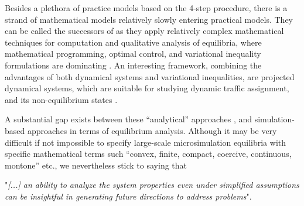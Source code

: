 Besides a plethora of practice models based on the 4-step procedure, there is a strand of mathematical models relatively slowly entering practical models. They can be called the successors of \citet[][]{BeckmannEtAl_1956} as they apply relatively complex mathematical techniques for computation and qualitative analysis of equilibria, where mathematical programming, optimal control, and variational inequality formulations are dominating \citep[][]{KinderlehrerStampacchia_1980, Dafermos_TransScience_1980, Smith_TransResB_1979, Dafermos_MP_1983, Smith_TransResB_1993, FrieszEtAl_OR_1993, Smith_TransResB_1993, Nagurney_1993, Friesz_TransScience_1996, Nagurney_FloudasPardalos_2001, BierlaireCrittin_TransScience_2006, LinDYEtAl_TRR_2008, Friesz_Hillier_2010, HarkerPang_MP_1990, NoorEtAl_JCAM_1993}. An interesting framework, combining the advantages of both dynamical systems \citep[e.g.,][]{Jin_TransResB_2005} and variational inequalities, are projected dynamical systems, which are suitable for studying dynamic traffic assignment, and its non-equilibrium states \citep[][]{NagurneyZhang_1996, Nagurney_FloudasPardalos_2009, DupuisNagurney_AOR_1993}.

A substantial gap exists between these ``analytical'' approaches \citep[][p.234]{PeetaZiliaskopoulos_NSE_2001}, and simulation-based approaches in terms of equilibrium analysis. Although it may be very difficult if not impossible to specify large-scale microsimulation equilibria with specific mathematical terms such ``convex, finite, compact, coercive, continuous, montone'' etc., we nevertheless stick to \citet[][p.243]{PeetaZiliaskopoulos_NSE_2001} saying that \begin{spacing}{1.0} "\emph{[...] an ability to analyze the system properties even under simplified assumptions can be insightful in generating future directions to address problems}". \end{spacing}



